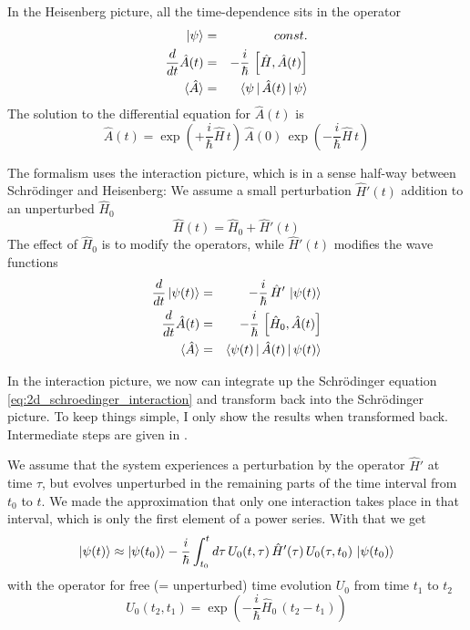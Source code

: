 In the Heisenberg picture, all the time-dependence sits in the operator
\begin{eqnarray}
 \ket{\psi} &=& const. \\
 \frac{d}{dt} \hat{A}(t) &=& - \frac{i}{\hbar} \, \left[ \hat{H} , \hat{A}(t) \right] \\
 \braket{\hat{A}} &=& \braket{\psi \, | \,\hat{A} (t) \, |\, \psi } 
\end{eqnarray}
The solution to the differential equation for  $\hat{A}(t)$ is
\begin{equation}
 \hat{A}(t) = \exp \left(+ \frac{i}{\hbar} \hat{H} \, t \right) \, \hat{A}(0) \, \exp \left(- \frac{i}{\hbar} \hat{H} \, t \right)
\end{equation}


The formalism uses the  interaction picture, which is in a sense half-way between Schrödinger and Heisenberg: We assume a small perturbation $\hat{H}'(t)$ addition to an unperturbed $\hat{H}_0$
\begin{equation}
 \hat{H}(t) = \hat{H}_0 + \hat{H}'(t) \label{eq:2d_hamilton_perturbation}
\end{equation}
The effect of  $\hat{H}_0$ is to modify the operators, while $\hat{H}'(t)$ modifies the wave functions
\begin{eqnarray}
  \frac{d}{dt} \ket{\psi(t)} &=& - \frac{i}{\hbar} \, \hat{H}' \, \ket{\psi(t)}  \label{eq:2d_schroedinger_interaction}\\
 \frac{d}{dt} \hat{A}(t) &=& - \frac{i}{\hbar} \, \left[ \hat{H}_0 , \hat{A}(t) \right] \\
 \braket{\hat{A}} &=& \braket{\psi(t) \, | \,\hat{A} (t) \, |\, \psi(t) } 
\end{eqnarray}


In the interaction picture, we now can integrate up  the Schrödinger equation \ref{eq:2d_schroedinger_interaction} and transform  back into the Schrödinger picture. To keep things simple, I only show the results when transformed back. Intermediate steps are given in \cite{Hamm-dummies}.


We assume  that the system experiences a perturbation by the operator $\hat{H}'$ at time $\tau$, but evolves unperturbed in the remaining parts of the time interval from $t_0$ to $t$. We made the approximation that only one interaction takes place in that interval, which is only the first element of a power series. With that we get
\begin{equation}
\ket{\psi(t)}  
  \approx  \ket{\psi(t_0)} - \frac{i}{\hbar} \int_{t_0}^t d \tau \,  U_0( t , \tau) \,\hat{H}'(\tau) \,  U_0 (\tau , t_0) \, \ket{\psi(t_0)}  \label{eq:2d_time_evol}
\end{equation}
with the operator for free (= unperturbed) time evolution $U_0$ from time $t_1$ to $t_2$
\begin{equation}
 U_0(t_2, t_1) = \exp \left(- \frac{i}{\hbar} \hat{H}_0 \, ( t_2- t_1) \right)
\end{equation}



